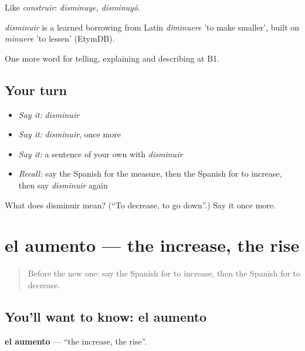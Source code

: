 Like \emph{construir}: \emph{disminuye, disminuyó}.

\begin{cousinweb}
\emph{disminuir} is a learned borrowing from Latin \emph{diminuere} 'to make smaller', built on \emph{minuere} 'to lessen' (EtymDB).
\end{cousinweb}

\begin{grammarlens}[title={What you've built}]
One more word for telling, explaining and describing at B1.
\end{grammarlens}

\subsection*{Your turn}
\begin{itemize}
\raggedright
  \item \emph{Say it:} \emph{disminuir}
  \item \emph{Say it:} \emph{disminuir}, once more
  \item \emph{Say it:} a sentence of your own with \emph{disminuir}
  \item \emph{Recall:} say the Spanish for the measure, then the Spanish for to increase, then say \emph{disminuir} again
\end{itemize}

\begin{tcolorbox}[breakable,colback=teal!4,colframe=teal!35!black,title={Before you move on}]
What does disminuir mean? (\textquotedblleft{}To decrease, to go down\textquotedblright{}.) Say it once more.
\end{tcolorbox}
\section[el aumento]{el aumento — the increase, the rise}

\label{lesson:ES-C608-aumento}



\begin{quote}
Before the new one: say the Spanish for to increase, then the Spanish for to decrease.
\end{quote}

\subsection*{You'll want to know: el aumento}
\textbf{el aumento} — \textquotedblleft{}the increase, the rise\textquotedblright{}.

